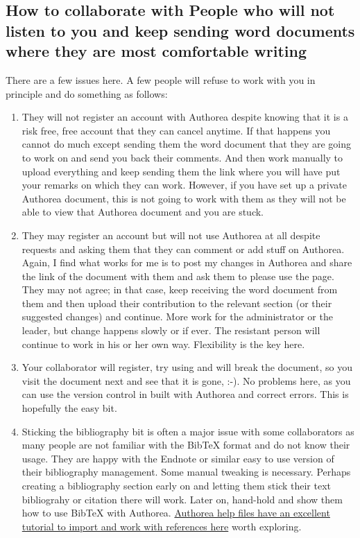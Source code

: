 \subsection{How to collaborate with People who will not listen to you and keep sending word documents where they are most comfortable writing}

There are a few issues here. A few people will refuse to work with you in principle and do something as follows:

\begin{enumerate}
\item They will not register an account with Authorea despite knowing that it is a risk free, free account that they can cancel anytime. If that happens you cannot do much except sending them the word document that they are going to work on and send you back their comments. And then work manually to upload everything and keep sending them the link where you will have put your remarks on which they can work. However, if you have set up a private Authorea document, this is not going to work with them as they will not be able to view that Authorea document and you are stuck. 
\item They may register an account but will not use Authorea at all despite requests and asking them that they can comment or add stuff on Authorea. Again, I find what works for me is to post my changes in Authorea and share the link of the document with them and ask them to please use the page. They may not agree; in that case, keep receiving the word document from them and then upload their contribution to the relevant section (or their suggested changes) and continue. More work for the administrator or the leader, but change happens slowly or if ever. The resistant person will continue to work in his or her own way. Flexibility is the key here. 
\item Your collaborator will register, try using and will break the document, so you visit the document next and see that it is gone, :-). No problems here, as you can use the version control in built with Authorea and correct errors. This is hopefully the easy bit.
\item Sticking the bibliography bit is often a major issue with some collaborators as many people are not familiar with the BibTeX format and do not know their usage. They are happy with the Endnote or similar easy to use version of their bibliography management. Some manual tweaking is necessary. Perhaps creating a bibliography section early on and letting them stick their text bibliograhy or citation there will work. Later on, hand-hold and show them how to use BibTeX with Authorea. \href{https://www.authorea.com/users/9932/articles/12628/_show_article}{Authorea help files have an excellent tutorial to import and work with references here} worth exploring. 
\end{enumerate}

